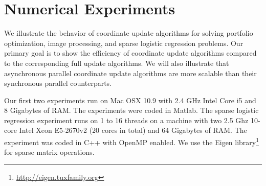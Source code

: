 \section{Numerical Experiments}\label{sec:numerical}
We illustrate the behavior of coordinate update algorithms for solving portfolio optimization, image processing, and sparse logistic regression problems. Our primary goal is to show the efficiency of coordinate update algorithms compared to the corresponding full update algorithms. We will also illustrate that asynchronous parallel coordinate update algorithms are more scalable than their synchronous parallel counterparts. 

Our first two experiments run on Mac OSX 10.9 with 2.4 GHz Intel Core i5 and 8 Gigabytes of RAM. The experiments were coded in Matlab. The sparse logistic regression experiment runs on 1 to 16 threads on a machine with two 2.5 Ghz 10-core Intel Xeon E5-2670v2 (20 cores in total) and $64$ Gigabytes of RAM. The experiment was coded in C++ with OpenMP enabled. We use the Eigen library\footnote{\url{http://eigen.tuxfamily.org}} for sparse matrix operations.

